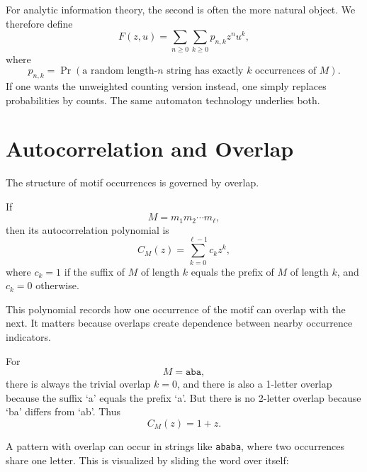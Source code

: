 For analytic information theory, the second is often the more natural object. We therefore define
\[
  F(z,u) = \sum_{n \ge 0}\sum_{k \ge 0} p_{n,k} z^n u^k,
\]
where
\[
  p_{n,k} = \Pr(\text{a random length-}n\text{ string has exactly }k\text{ occurrences of }M).
\]
If one wants the unweighted counting version instead, one simply replaces probabilities by counts. The same automaton technology underlies both.

\section{Autocorrelation and Overlap}

The structure of motif occurrences is governed by overlap.

\begin{definition}
If
\[
  M = m_1m_2\cdots m_\ell,
\]
then its autocorrelation polynomial is
\[
  C_M(z) = \sum_{k=0}^{\ell-1} c_k z^k,
\]
where $c_k=1$ if the suffix of $M$ of length $k$ equals the prefix of $M$ of length $k$, and $c_k=0$ otherwise.
\end{definition}

This polynomial records how one occurrence of the motif can overlap with the next. It matters because overlaps create dependence between nearby occurrence indicators.

\begin{example}
For
\[
  M=\texttt{aba},
\]
there is always the trivial overlap $k=0$, and there is also a 1-letter overlap because the suffix `a' equals the prefix `a'. But there is no 2-letter overlap because `ba' differs from `ab'. Thus
\[
  C_M(z)=1+z.
\]

A pattern with overlap can occur in strings like \texttt{ababa}, where two occurrences share one letter. This is visualized by sliding the word over itself:

\begin{center}
\end{center}
\end{example}

